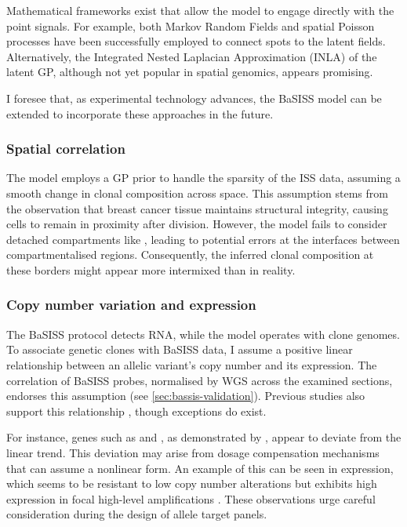 Mathematical frameworks exist that allow the model to engage directly with the point signals. For example, both Markov Random Fields \parencite{Petukhov2022-pv} and spatial Poisson processes \parencite{Qian2020-mp} have been successfully employed to connect spots to the latent fields. Alternatively, the Integrated Nested Laplacian Approximation (INLA) \parencite{Rue2009-an} of the latent \ac{GP}, although not yet popular in spatial genomics, appears promising.

I foresee that, as experimental technology advances, the \ac{BaSISS} model can be extended to incorporate these approaches in the future.


\subsubsection*{Spatial correlation}
The model employs a \ac{GP} prior to handle the sparsity of the \ac{ISS} data, assuming a smooth change in clonal composition across space. This assumption stems from the observation that breast cancer tissue maintains structural integrity, causing cells to remain in proximity after division. However, the model fails to consider detached compartments like , leading to potential errors at the interfaces between compartmentalised regions. Consequently, the inferred clonal composition at these borders might appear more intermixed than in reality. 

\subsubsection*{Copy number variation and expression}
The \ac{BaSISS} protocol detects RNA, while the model operates with clone genomes. To associate genetic clones with \ac{BaSISS} data, I assume a positive linear relationship between an allelic variant's copy number and its expression. The correlation of \ac{BaSISS} probes, normalised by \ac{WGS} across the examined sections, endorses this assumption (see \cref{sec:bassis-validation}). Previous studies also support this relationship \parencite{Handsaker2015-jx}, though exceptions do exist.

For instance, genes such as  and , as demonstrated by \textcite{Shao2019-vq}, appear to deviate from the linear trend. This deviation may arise from dosage compensation mechanisms that can assume a nonlinear form. An example of this can be seen in  expression, which seems to be resistant to low copy number alterations but exhibits high expression in focal high-level amplifications \parencite{Schukken2022-jm}. These observations urge careful consideration during the design of allele target panels.


